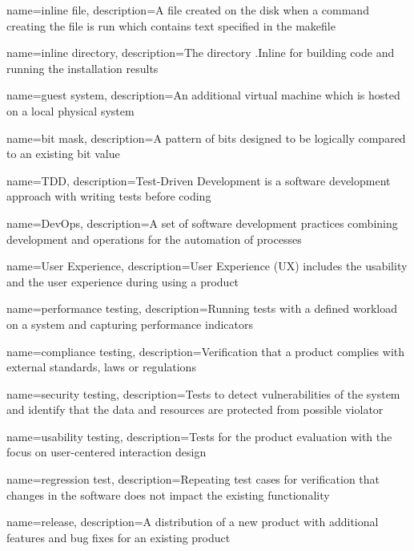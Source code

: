 {
    name={inline file},
    description={A file created on the disk when a command creating the file is run which contains text specified in the makefile}
}

{
    name={inline directory},
    description={The directory .Inline for building code and running the installation results}
}

{
    name={guest system},
    description={An additional virtual machine which is hosted on a local physical system}
}

{
    name={bit mask},
    description={A pattern of bits designed to be logically compared to an existing bit value}
}

{
    name={TDD},
    description={Test-Driven Development is a software development approach with writing tests before coding}
}

{
    name={DevOps},
    description={A set of software development practices combining development and operations for the automation of processes}
}

{
    name={User Experience},
    description={User Experience (UX) includes the usability and the user experience during using a product}
}

{
    name={performance testing},
    description={Running tests with a defined workload on a system and capturing performance indicators}
}

{
    name={compliance testing},
    description={Verification that a product complies with external standards, laws or regulations}
}

{
    name={security testing},
    description={Tests to detect vulnerabilities of the system and identify that the data and resources are protected from possible violator}
}

{
    name={usability testing},
    description={Tests for the product evaluation with the focus on user-centered interaction design}
}

{
    name={regression test},
    description={Repeating test cases for verification that changes in the software does not impact the existing functionality}
}

{
    name={release},
    description={A distribution of a new product with additional features and bug fixes for an existing product}
}

